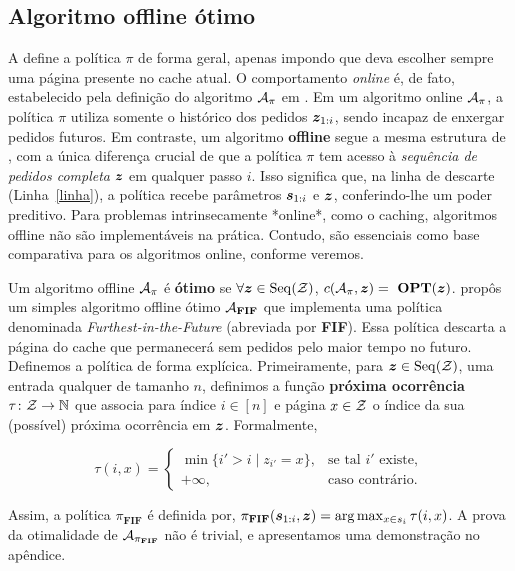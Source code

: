 \subsection{Algoritmo offline ótimo}

A  define a política \(\pi\) de forma geral, apenas impondo que deva escolher sempre uma página presente no cache atual. O comportamento \emph{online} é, de fato, estabelecido pela definição do algoritmo \(\mathcal{A}_\pi\) em . Em um algoritmo online \(\mathcal{A}_\pi\), a política \(\pi\) utiliza somente o histórico dos pedidos \(\bm{z}_{1:i}\), sendo incapaz de enxergar pedidos futuros. Em contraste, um algoritmo \textbf{offline} segue a mesma estrutura de , com a única diferença crucial de que a política \(\pi\) tem acesso à \emph{sequência de pedidos completa} \(\bm{z}\) em qualquer passo \(i\). Isso significa que, na linha de descarte (Linha~\ref{linha}), a política recebe parâmetros \(\bm{s}_{1:i}\) e \(\bm{z}\), conferindo-lhe um poder preditivo. Para problemas intrinsecamente *online*, como o caching, algoritmos offline não são implementáveis na prática. Contudo, são essenciais como base comparativa para os algoritmos online, conforme veremos.

Um algoritmo offline \(\mathcal{A}_\pi\) é \textbf{ótimo} se \(\forall \bm{z} \in \operatorname{Seq}(\mathcal{Z})\), \(c(\mathcal{A}_\pi, \bm{z}) = \ \textbf{OPT}(\bm{z})\). \textcite{Belady66} propôs um simples algoritmo offline ótimo \(\mathcal{A}_{\bold{FIF}}\) que implementa uma política denominada \textit{Furthest-in-the-Future} (abreviada por \textbf{FIF}). Essa política descarta a página do cache que permanecerá sem pedidos pelo maior tempo no futuro. Definemos a política de forma explícica. Primeiramente, para \(\bm{z} \in \operatorname{Seq}(\mathcal{Z})\), uma entrada qualquer de tamanho \(n\), definimos a função \textbf{próxima ocorrência} \(\tau \colon \mathcal{Z} \to \mathbb{N}\) que associa para índice \(i \in [n]\) e página \(x \in \mathcal{Z}\) o índice da sua (possível) próxima ocorrência em \(\bm{z}\). Formalmente,

\begin{equation*}
\tau(i, x) =
\begin{cases}
  \min \{ i' > i \mid z_{i'} = x \}, & \text{se tal } i' \text{ existe}, \\
  +\infty, & \text{caso contrário}.
\end{cases}
\end{equation*}

Assim, a política \( \pi_{\mathbf{FIF}} \) é definida por, \( \pi_{\mathbf{FIF}} (\bm{s}_{1:i}, \bm{z}) = \arg {\max_{x \in s_i} \tau(i, x)}\). A prova da otimalidade de \(\mathcal{A}_{\pi_{\mathbf{FIF}}}\) não é trivial, e apresentamos uma demonstração no apêndice.

